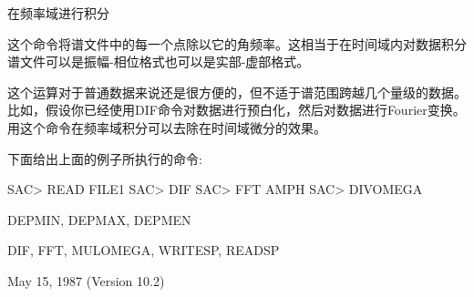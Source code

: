 \label{cmd:divomega}

在频率域进行积分

这个命令将谱文件中的每一个点除以它的角频率。这相当于在时间域内对数据积分谱文件可以是振幅-相位格式也可以是实部-虚部格式。

这个运算对于普通数据来说还是很方便的，但不适于谱范围跨越几个量级的数据。比如，假设你已经使用DIF命令对数据进行预白化，然后对数据进行Fourier变换。用这个命令在频率域积分可以去除在时间域微分的效果。

下面给出上面的例子所执行的命令:
\begin{SACCode}
SAC> READ FILE1
SAC> DIF
SAC> FFT AMPH
SAC> DIVOMEGA
\end{SACCode}

DEPMIN, DEPMAX, DEPMEN

DIF, FFT, MULOMEGA, WRITESP, READSP

May 15, 1987 (Version 10.2)
